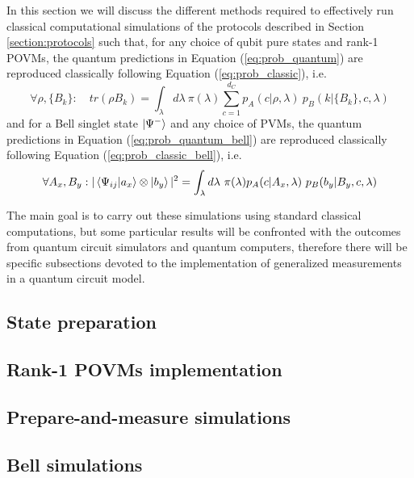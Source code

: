 In this section we will discuss the different methods required to effectively run classical computational simulations of the protocols described in Section \ref{section:protocols} such that, for any choice of qubit pure states and rank-1 POVMs, the quantum predictions in Equation (\ref{eq:prob_quantum}) are reproduced classically following Equation (\ref{eq:prob_classic}), i.e.
\begin{equation}
\forall \rho, \{B_{k}\}:\quad tr(\rho B_{k}) = \int_{\lambda} d\lambda\ \pi(\lambda) \sum_{c=1}^{d_C} p_A(c|\rho, \lambda)\ p_B(k|\{B_{k}\}, c, \lambda)    
\end{equation}
and for a Bell singlet state $\ket{\Psi^{-}}$ and any choice of PVMs, the quantum predictions in Equation (\ref{eq:prob_quantum_bell}) are reproduced classically following Equation (\ref{eq:prob_classic_bell}), i.e.
\begin{equation}
\forall A_{x}, B_{y}: |\bra{\Psi_{ij}}\ket{a_{x}} \otimes \ket{b_{y}}|^{2} = \int_{\lambda} d\lambda\ \pi(\lambda) p_A(c|A_{x}, \lambda)\ p_B(b_{y}|B_{y}, c, \lambda)
\end{equation}


The main goal is to carry out these simulations using standard classical computations, but some particular results will be confronted with the outcomes from quantum circuit simulators and quantum computers, therefore there will be specific subsections devoted to the implementation of generalized measurements in a quantum circuit model. 
\subsection{State preparation}

\subsection{Rank-1 POVMs implementation}

\subsection{Prepare-and-measure simulations}

\subsection{Bell simulations}

